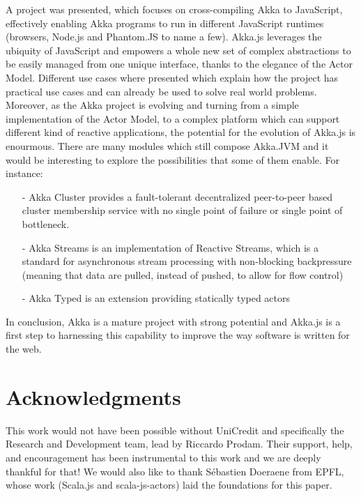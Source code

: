 \documentclass{sig-alternate}
\begin{document}
A project was presented, which focuses on cross-compiling Akka to JavaScript, effectively enabling Akka programs to run in different
JavaScript runtimes (browsers, Node.js and Phantom.JS to name a few).
Akka.js leverages the ubiquity of JavaScript and empowers a whole new set of complex abstractions to be easily managed from one
unique interface, thanks to the elegance of the Actor Model. Different use cases where presented which explain how the project
has practical use cases and can already be used to solve real world problems.
Moreover, as the Akka project is evolving and turning from a simple implementation of the Actor Model, to a complex platform
which can support different kind of reactive applications, the potential for the evolution of Akka.js is enourmous.
There are many modules which still compose Akka.JVM and it would be interesting to explore the possibilities that some of them
enable. For instance:
\begin{itemize}
\item[-] Akka Cluster provides a fault-tolerant decentralized peer-to-peer based cluster membership service with no single point of failure or single point of bottleneck.
\item[-] Akka Streams is an implementation of Reactive Streams, which is a standard for asynchronous stream processing with non-blocking backpressure (meaning that data
are pulled, instead of pushed, to allow for flow control)
\item[-] Akka Typed is an extension providing statically typed actors
\end{itemize}
In conclusion, Akka is a mature project with strong potential and Akka.js is a first step to harnessing this capability to
improve the way software is written for the web.


\section{Acknowledgments}

This work would not have been possible without UniCredit and specifically the Research and Development team, lead by Riccardo Prodam. Their support, help, and encouragement has been instrumental to this work and we are deeply thankful for that!
We would also like to thank S\'{e}bastien Doeraene from EPFL, whose work (Scala.js and scala-js-actors) laid the foundations for this paper.



%

%
%

\end{document}

